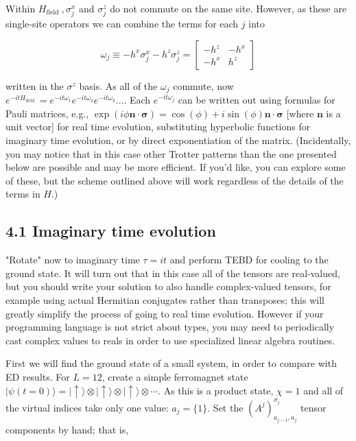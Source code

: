 \documentclass[12pt]{article}
\begin{document}
Within $H_{\text {field }}, \sigma_{j}^{x}$ and $\sigma_{j}^{z}$ do not commute on the same site. However, as these are single-site operators we can combine the terms for each $j$ into

\[
\omega_{j} \equiv-h^{x} \sigma_{j}^{x}-h^{z} \sigma_{j}^{z}=\left[\begin{array}{cc}
-h^{z} & -h^{x}  \tag{20}\\
-h^{x} & h^{z}
\end{array}\right]
\]

written in the $\sigma^{z}$ basis. As all of the $\omega_{j}$ commute, now $e^{-i t H_{\text {field }}}=e^{-i t \omega_{1}} e^{-i t \omega_{2}} e^{-i t \omega_{3}} \ldots$. Each $e^{-i t \omega_{j}}$ can be written out using formulas for Pauli matrices, e.g., $\exp (i \phi \boldsymbol{n} \cdot \boldsymbol{\sigma})=\cos (\phi)+i \sin (\phi) \boldsymbol{n} \cdot \boldsymbol{\sigma}$ [where $\boldsymbol{n}$ is a unit vector] for real time evolution, substituting hyperbolic functions for imaginary time evolution, or by direct exponentiation of the matrix. (Incidentally, you may notice that in this case other Trotter patterns than the one presented below are possible and may be more efficient. If you'd like, you can explore some of these, but the scheme outlined above will work regardless of the details of the terms in $H$.)

\subsection*{4.1 Imaginary time evolution}
"Rotate" now to imaginary time $\tau=i t$ and perform TEBD for cooling to the ground state. It will turn out that in this case all of the tensors are real-valued, but you should write your solution to also handle complex-valued tensors, for example using actual Hermitian conjugates rather than transposes; this will greatly simplify the process of going to real time evolution. However if your programming language is not strict about types, you may need to periodically cast complex values to reals in order to use specialized linear algebra routines.

First we will find the ground state of a small system, in order to compare with ED results. For $L=12$, create a simple ferromagnet state $|\psi(t=0)\rangle=|\uparrow\rangle \otimes|\uparrow\rangle \otimes|\uparrow\rangle \otimes \cdots$. As this is a product state, $\chi=1$ and all of the virtual indices take only one value: $a_{j}=\{1\}$. Set the $\left(A^{j}\right)_{a_{j-1}, a_{j}}^{\sigma_{j}}$ tensor components by hand; that is,
\end{document}
